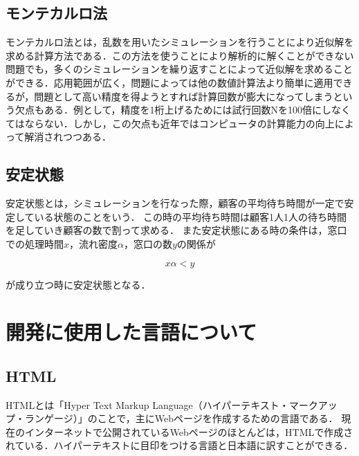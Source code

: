 \documentclass[12pt,a4j]{ltjsarticle}
\begin{document}
\clearpage

\subsection{モンテカルロ法}
モンテカルロ法とは，乱数を用いたシミュレーションを行うことにより近似解を求める計算方法である．この方法を使うことにより解析的に解くことができない問題でも，多くのシミュレーションを繰り返すことによって近似解を求めることができる．応用範囲が広く，問題によっては他の数値計算法より簡単に適用できるが，問題として高い精度を得ようとすれば計算回数が膨大になってしまうという欠点もある．例として，精度を1桁上げるためには試行回数Nを100倍にしなくてはならない．しかし，この欠点も近年ではコンピュータの計算能力の向上によって解消されつつある．

\subsection{安定状態}
安定状態とは，シミュレーションを行なった際，顧客の平均待ち時間が一定で安定している状態のことをいう．
この時の平均待ち時間は顧客1人1人の待ち時間を足していき顧客の数で割って求める．
また安定状態にある時の条件は，窓口での処理時間$x$，流れ密度$\alpha$，窓口の数$y$の関係が

\begin{equation}
	x\alpha < y \tag{I}
	\label{eq:I式}
\end{equation}

\noindent
が成り立つ時に安定状態となる．
\clearpage

\section{開発に使用した言語について}
\subsection{HTML}
HTMLとは「Hyper Text Markup Language（ハイパーテキスト・マークアップ・ランゲージ）」のことで，主にWebページを作成するための言語である\cite{html}．
現在のインターネットで公開されているWebページのほとんどは，HTMLで作成されている．ハイパーテキストに目印をつける言語と日本語に訳すことができる．
\end{document}
